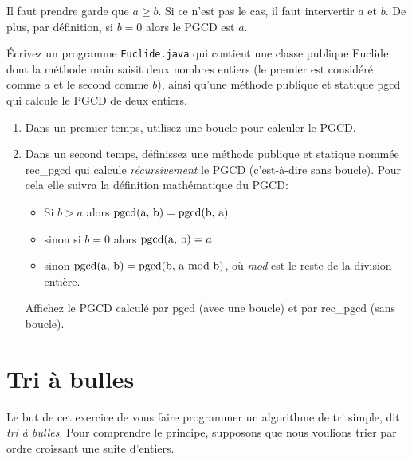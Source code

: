 \documentclass[11pt,a4paper]{article}
\newcommand{\pgcd}[2]{\textnormal{pgcd(#1, #2)}}
\newcommand{\bitem}{\item[$\bullet$]}
\begin{document}
\medskip

\noindent Il faut prendre garde que $a \geqslant b$. Si ce n'est pas
le cas, il faut intervertir $a$ et $b$. De plus, par définition, si $b
= 0$ alors le PGCD est $a$.

\medskip

\noindent Écrivez un programme \texttt{Euclide.java} qui contient une
classe publique \textsf{Euclide} dont la méthode \textsf{main} saisit
deux nombres entiers (le premier est considéré comme $a$ et le second
comme $b$), ainsi qu'une méthode publique et statique \textsf{pgcd}
qui calcule le PGCD de deux entiers.

\begin{enumerate}

  \item Dans un premier temps, utilisez une boucle pour calculer le
  PGCD.

  \item Dans un second temps, définissez une méthode publique et
  statique nommée \textsf{rec\_pgcd} qui calcule \emph {récursivement}
  le PGCD (c'est-à-dire sans bou\-cle). Pour cela elle suivra la
  définition mathématique du PGCD:

  \begin{itemize}

    \bitem Si $b >a$ alors $\pgcd{a}{b} = \pgcd{b}{a}$

    \bitem sinon si $b = 0$ alors $\pgcd{a}{b} = a$

    \bitem sinon $\pgcd{a}{b} = \pgcd{b}{a \textnormal{mod} b}$, où
    \emph{mod} est le reste de la division entière.

  \end{itemize}

   Affichez le PGCD calculé par \textsf{pgcd} (avec une boucle) et par
   \textsf{rec\_pgcd} (sans boucle).

\end{enumerate}


\section{Tri à bulles}

\noindent Le but de cet exercice de vous faire programmer un
algorithme de tri simple, dit \emph{tri à bulles}. Pour comprendre le
principe, supposons que nous voulions trier par ordre croissant une
suite d'entiers.

\medskip
\end{document}
